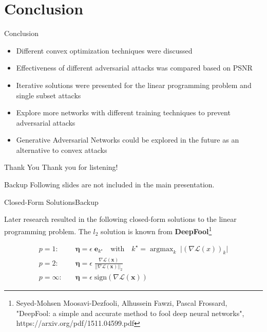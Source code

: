 \documentclass[xcolor={cmyk}]{beamer}
\newcommand{\mcl}{\mathcal}
\newcommand{\bm}{\boldsymbol}
\DeclareMathOperator*{\argmax}{argmax}
\begin{document}
\section{Conclusion}
\begin{frame}{Conclusion}

	\begin{itemize}
		\item Different convex optimization techniques were discussed
		\item Effectiveness of different adversarial attacks was compared based on PSNR
		\item Iterative solutions were presented for the linear programming problem and single subset attacks
		\item Explore more networks with different training techniques to prevent adversarial attacks
		\item Generative Adversarial Networks could be explored in the future as an alternative to convex attacks
	\end{itemize}

\end{frame}


\begin{frame}{Thank You}
	\centering
	Thank you for listening!

\end{frame}




\begin{frame}{Backup}
	\centering
	Following slides are not included in the main presentation.
\end{frame}


\begin{frame}{Closed-Form Solutions}{Backup}

	Later research resulted in the following closed-form solutions to the linear programming problem. The $l_2$ solution is known from \textbf{DeepFool}\footnote{Seyed-Mohsen Moosavi-Dezfooli, Alhussein Fawzi, Pascal Frossard, "DeepFool: a simple and accurate method to fool deep neural networks", https://arxiv.org/pdf/1511.04599.pdf}

	\begin{equation*}
	\begin{aligned}
	p = 1: & \quad \bm{\eta} = \epsilon \; \bm{e}_{k^\star} \quad \text{with} \quad k^\star = \argmax_{k} \; \lvert (\nabla \mcl{L}(x))_k \rvert \\[20pt]
	p = 2: & \quad \bm{\eta} = \epsilon \; \frac{\nabla \mcl{L}(\bm{x})}{\lvert\lvert \nabla \mcl{L}(\bm{x}) \rvert\rvert_2} \\[20pt]
	p = \infty: & \quad \bm{\eta} = \epsilon \; \text{sign}(\nabla \mcl{L}(\bm{x}))
	\end{aligned}
	\label{linear_programming_closed}
	\end{equation*}

\end{frame}
\end{document}

